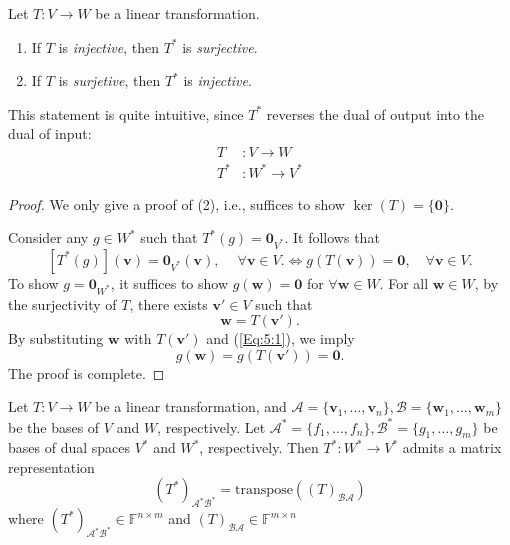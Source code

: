 \begin{proposition}\label{pro:5:5}
Let $T:V\to W$ be a linear transformation.
\begin{enumerate}
\item
If $T$ is \emph{injective}, then $T^*$ is \emph{surjective}.
\item
If $T$ is \emph{surjetive}, then $T^*$ is \emph{injective}.
\end{enumerate}
\end{proposition}
This statement is quite intuitive, since $T^*$ reverses the dual of output into the dual of input:
\[
\begin{aligned}
T&:V\to W\\
T^*&:W^*\to V^*
\end{aligned}
\]
\begin{proof}
We only give a proof of (2), i.e., suffices to show $\ker(T) = \{\bm0\}$.

Consider any $g\in W^*$ such that $T^*(g) = \bm0_{V^*}$. It follows that 
\begin{equation}\label{Eq:5:1}
[T^*(g)](\bm v) = \bm0_{V^*}(\bm v),\ \quad\forall \bm v\in V.
\Longleftrightarrow
g(T(\bm v))=\bm0,\quad\forall\bm v\in V.
\end{equation}
To show $g=\bm0_{W^*}$, it suffices to show $g(\bm w)=\bm0$ for $\forall\bm w\in W$. 
For all $\bm w\in W$, by the surjectivity of $T$, there exists $\bm v'\in V$ such that 
\[
\bm w = T(\bm v').
\]
By substituting $\bm w$ with $T(\bm v')$ and (\ref{Eq:5:1}), we imply
\[
g(\bm w) = g(T(\bm v'))=\bm0.
\]
The proof is complete.
\end{proof}

\begin{proposition}
Let $T:V\to W$ be a linear transformation,
and $\mathcal{A} = \{\bm v_1,\dots,\bm v_n\},\mathcal{B}=\{\bm w_1,\dots,\bm w_m\}$ 
be the bases of $V$ and $W$, respectively. 
Let
$\mathcal{A}^* = \{f_1,\dots,f_n\},\mathcal{B}^*=\{g_1,\dots,g_m\}$ be bases of dual spaces $V^*$ and $W^*$, respectively.
Then $T^*:W^*\to V^*$ admits a matrix representation
\[
(T^*)_{\mathcal{A}^*\mathcal{B}^*}
=
\text{transpose}\left((T)_{\mathcal{B}\mathcal{A}}\right)
\]
where $(T^*)_{\mathcal{A}^*\mathcal{B}^*}\in\mathbb{F}^{n\times m}$ and $(T)_{\mathcal{B}\mathcal{A}}\in\mathbb{F}^{m\times n}$
\end{proposition}



